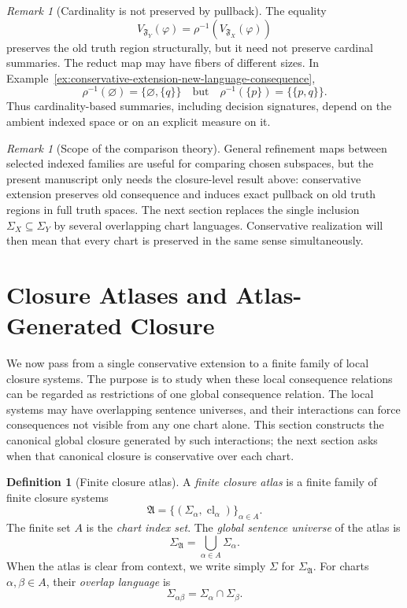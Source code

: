 \documentclass[11pt]{amsart}
\numberwithin{equation}{section}
\theoremstyle{plain}
\theoremstyle{definition}
\newtheorem{definition}[theorem]{Definition}
\theoremstyle{remark}
\newtheorem{remark}[theorem]{Remark}
\newcommand{\Cl}{\operatorname{cl}}
\newcommand{\F}{\mathfrak F}
\newcommand{\A}{\mathfrak A}
\newcommand{\Sig}{\Sigma}
\begin{document}
\begin{remark}[Cardinality is not preserved by pullback]
The equality
\[
  V_{\F_Y}(\varphi)=\rho^{-1}(V_{\F_X}(\varphi))
\]
preserves the old truth region structurally, but it need not preserve cardinal summaries. The reduct map may have fibers of different sizes. In Example~\ref{ex:conservative-extension-new-language-consequence},
\[
  \rho^{-1}(\varnothing)=\{\varnothing,\{q\}\}
  \quad\text{but}\quad
  \rho^{-1}(\{p\})=\{\{p,q\}\}.
\]
Thus cardinality-based summaries, including decision signatures, depend on the ambient indexed space or on an explicit measure on it.
\end{remark}

\begin{remark}[Scope of the comparison theory]
General refinement maps between selected indexed families are useful for comparing chosen subspaces, but the present manuscript only needs the closure-level result above: conservative extension preserves old consequence and induces exact pullback on old truth regions in full truth spaces.  The next section replaces the single inclusion \(\Sig_X\subseteq\Sig_Y\) by several overlapping chart languages.  Conservative realization will then mean that every chart is preserved in the same sense simultaneously.
\end{remark}




\section{Closure Atlases and Atlas-Generated Closure}
\label{sec:closure-atlases}

We now pass from a single conservative extension to a finite family of local closure systems.  The purpose is to study when these local consequence relations can be regarded as restrictions of one global consequence relation.  The local systems may have overlapping sentence universes, and their interactions can force consequences not visible from any one chart alone.  This section constructs the canonical global closure generated by such interactions; the next section asks when that canonical closure is conservative over each chart.

\begin{definition}[Finite closure atlas]
A \emph{finite closure atlas} is a finite family of finite closure systems
\[
  \A=\{(\Sig_\alpha,\Cl_\alpha)\}_{\alpha\in A}.
\]
The finite set \(A\) is the \emph{chart index set}. The \emph{global sentence universe} of the atlas is
\[
  \Sig_{\A}=\bigcup_{\alpha\in A}\Sig_\alpha.
\]
When the atlas is clear from context, we write simply \(\Sig\) for \(\Sig_{\A}\). For charts \(\alpha,\beta\in A\), their \emph{overlap language} is
\[
  \Sig_{\alpha\beta}=\Sig_\alpha\cap\Sig_\beta.
\]
\end{definition}
\end{document}
